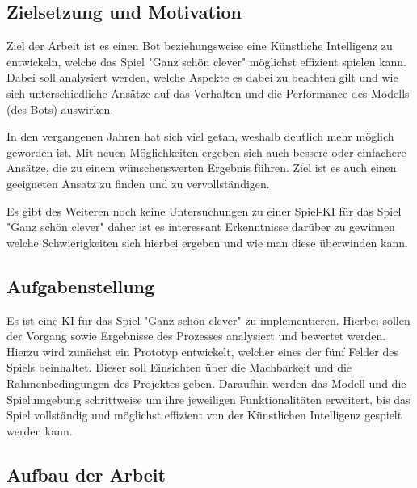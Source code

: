 \subsection{Zielsetzung und Motivation}
Ziel der Arbeit ist es einen Bot beziehungsweise eine Künstliche Intelligenz zu entwickeln, welche das Spiel "Ganz schön clever" möglichst effizient spielen kann. Dabei soll analysiert werden, welche Aspekte es dabei zu beachten gilt und wie sich unterschiedliche Ansätze auf das Verhalten und die Performance des Modells (des Bots) auswirken.

In den vergangenen Jahren hat sich viel getan, weshalb deutlich mehr möglich geworden ist. Mit neuen Möglichkeiten ergeben sich auch bessere oder einfachere Ansätze, die zu einem wünschenswerten Ergebnis führen. Ziel ist es auch einen geeigneten Ansatz zu finden und zu vervollständigen.

Es gibt des Weiteren noch keine Untersuchungen zu einer Spiel-KI für das Spiel "Ganz schön clever" daher ist es interessant Erkenntnisse darüber zu gewinnen welche Schwierigkeiten sich hierbei ergeben und wie man diese überwinden kann.
\subsection{Aufgabenstellung}
Es ist eine KI für das Spiel "Ganz schön clever" zu implementieren. Hierbei sollen der Vorgang sowie Ergebnisse des Prozesses analysiert und bewertet werden. Hierzu wird zunächst ein Prototyp entwickelt, welcher eines der fünf Felder des Spiels beinhaltet. Dieser soll Einsichten über die Machbarkeit und die Rahmenbedingungen des Projektes geben. Daraufhin werden das Modell und die Spielumgebung schrittweise um ihre jeweiligen Funktionalitäten erweitert, bis das Spiel vollständig und möglichst effizient von der Künstlichen Intelligenz gespielt werden kann.
\subsection{Aufbau der Arbeit}